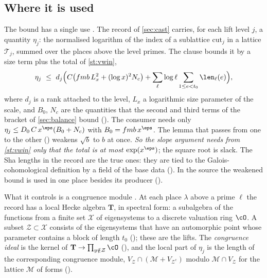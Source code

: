\subsection{Where it is used}
The bound has a single use \lvP. The record of \cref{sec:cast} carries, for each lift
level $j$, a quantity $\eta_j$: the normalised logarithm of the index of a sublattice
$\mathrm{cut}_j$ in a lattice $\mathcal T_j$, summed over the places above the level primes. The clause
 bounds it by a size term plus the total of \cref{st:vwin},
\[
\eta_j\ \le\ d_j\Bigl(C\bigl(fmb\,L_x^2+(\log x)^2N_c\bigr)+\sum_\ell\log\ell\sum_{1\le e<t_0}\len_\ell(e)\Bigr),
\]
where $d_j$ is a rank attached to the level, $L_x$ a logarithmic size parameter of the scale,
and $B_0$, $N_c$ are the quantities that the second and third terms of the bracket of
\cref{sec:balance} bound (). The consumer needs only
$\eta_j\le D_0\,C\,x^{\eps}(B_0+N_c)$ with $B_0=fmb\,x^\eps$. The
lemma that passes from one to the other () weakens $\sqrt b$ to $b$ at
once. \emph{So the slope argument needs from \cref{st:vwin} only that the total is at most
$\exp(x^{\eps})$}; the square root is slack. The Sha lengths in the record are the true ones:
they are tied to the Galois-cohomological definition by a field of the base data
(). In the source the weakened bound is used in one place besides its producer
().

What it controls is a congruence module \lvS. At each place $\lambda$ above a prime $\ell$ the record
has a local Hecke algebra $\mathbf T$, in spectral form: a subalgebra of the functions from a
finite set $\mathcal X$ of eigensystems to a discrete valuation ring $\cO$. A subset
$\mathcal Z\subset\mathcal X$
consists of the eigensystems that have an automorphic point whose parameter contains a block
of length $t_0$ (); these are the lifts. The \emph{congruence ideal} is the kernel of
$\mathbf T\to\prod_{y\notin\mathcal Z}\cO$ (), and the local part of $\eta_j$ is the
length of the corresponding congruence module,
$V_{\mathcal Z}\cap(\mathcal M+V_{\mathcal Z^c})$ modulo $\mathcal M\cap V_{\mathcal Z}$ for
the lattice $\mathcal M$ of forms ().

